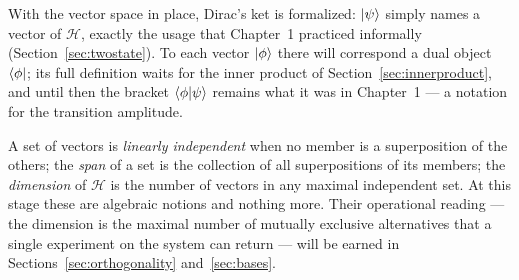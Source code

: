 With the vector space in place, Dirac's ket is formalized: $\ket{\psi}$ simply names a vector of $\mathcal{H}$, exactly the usage that Chapter~1 practiced informally (Section~\ref{sec:twostate}). To each vector $\ket{\phi}$ there will correspond a dual object $\bra{\phi}$; its full definition waits for the inner product of Section~\ref{sec:innerproduct}, and until then the bracket $\braket{\phi|\psi}$ remains what it was in Chapter~1 --- a notation for the transition amplitude.

A set of vectors is \emph{linearly independent} when no member is a superposition of the others; the \emph{span} of a set is the collection of all superpositions of its members; the \emph{dimension} of $\mathcal{H}$ is the number of vectors in any maximal independent set. At this stage these are algebraic notions and nothing more. Their operational reading --- the dimension is the maximal number of mutually exclusive alternatives that a single experiment on the system can return --- will be earned in Sections~\ref{sec:orthogonality} and~\ref{sec:bases}.

